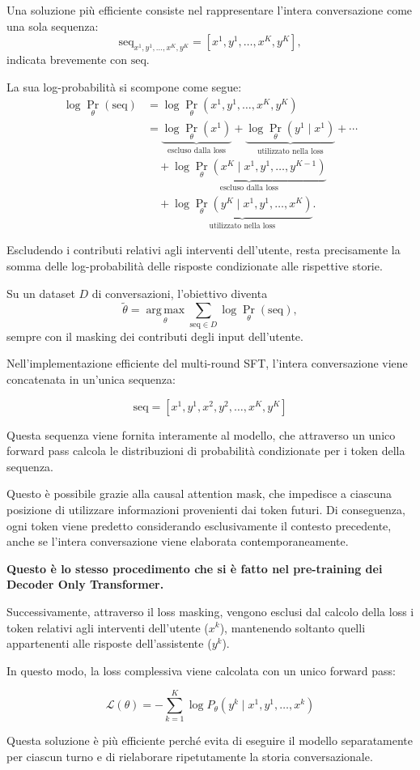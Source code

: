 Una soluzione più efficiente consiste nel rappresentare
l'intera conversazione come una sola sequenza:
\[
\mathrm{seq}_{x^1,y^1,\ldots,x^K,y^K}
=
[x^1,y^1,\ldots,x^K,y^K],
\]
indicata brevemente con $\mathrm{seq}$.

La sua log-probabilità si scompone come segue:
\[
\begin{aligned}
\log \Pr_{\theta}(\mathrm{seq})
&=
\log \Pr_{\theta}(x^1,y^1,\ldots,x^K,y^K)\\
&=
\underbrace{\log \Pr_{\theta}(x^1)}_{
    \text{escluso dalla loss}}
+
\underbrace{\log \Pr_{\theta}(y^1\mid x^1)}_{
    \text{utilizzato nella loss}}
+\cdots\\
&\quad+
\underbrace{
\log \Pr_{\theta}(x^K\mid x^1,y^1,\ldots,y^{K-1})
}_{\text{escluso dalla loss}}\\
&\quad+
\underbrace{
\log \Pr_{\theta}(y^K\mid x^1,y^1,\ldots,x^K)
}_{\text{utilizzato nella loss}}.
\end{aligned}
\tag{4.6}
\]

Escludendo i contributi relativi agli interventi dell'utente,
resta precisamente la somma delle log-probabilità
delle risposte condizionate alle rispettive storie.

Su un dataset $D$ di conversazioni, l'obiettivo diventa
\[
\tilde{\theta}
=
\operatorname*{arg\,max}_{\theta}
\sum_{\mathrm{seq}\in D}
\log \Pr_{\theta}(\mathrm{seq}),
\tag{4.7}
\]
sempre con il masking dei contributi degli input dell'utente.
\begin{observation}{}
Nell'implementazione efficiente del multi-round SFT, l'intera conversazione viene concatenata in un'unica sequenza:

$$
\mathrm{seq}=[x^1,y^1,x^2,y^2,\ldots,x^K,y^K]
$$

Questa sequenza viene fornita interamente al modello, che attraverso un unico forward pass calcola le distribuzioni di probabilità condizionate per i token della sequenza.

Questo è possibile grazie alla causal attention mask, che impedisce a ciascuna posizione di utilizzare informazioni provenienti dai token futuri. Di conseguenza, ogni token viene predetto considerando esclusivamente il contesto precedente, anche se l'intera conversazione viene elaborata contemporaneamente.

\textbf{Questo è lo stesso procedimento che si è fatto nel pre-training dei Decoder Only Transformer.}

Successivamente, attraverso il loss masking, vengono esclusi dal calcolo della loss i token relativi agli interventi dell'utente ($x^k$), mantenendo soltanto quelli appartenenti alle risposte dell'assistente ($y^k$).

In questo modo, la loss complessiva viene calcolata con un unico forward pass:

$$
\mathcal{L}(\theta)=
-\sum_{k=1}^{K}\log P_\theta(y^k\mid x^1,y^1,\ldots,x^k)
$$

Questa soluzione è più efficiente perché evita di eseguire il modello separatamente per ciascun turno e di rielaborare ripetutamente la storia conversazionale.
\end{observation}

